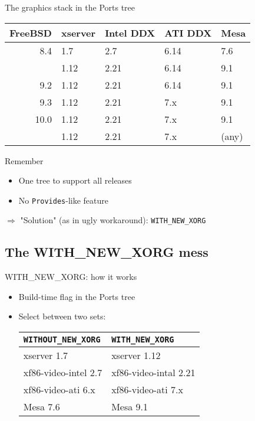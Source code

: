 \documentclass{beamer}
\begin{document}
\begin{frame}{The graphics stack in the Ports tree}
  \begin{tabular}{rllll}
    \hline
    \textbf{FreeBSD} & \textbf{xserver} & \textbf{Intel DDX} & \textbf{ATI DDX} & \textbf{Mesa} \\
    \hline
    8.4 & 1.7 & 2.7 & 6.14 & 7.6 \\
    \pause
    9.1 & 1.12 & 2.21 & 6.14 & 9.1 \\
    9.2 & 1.12 & 2.21 & 6.14 & 9.1 \\
    9.3 & 1.12 & 2.21 & 7.x & 9.1 \\
    10.0 & 1.12 & 2.21 & 7.x & 9.1 \\
    \pause
    10.1 & 1.12 & 2.21 & 7.x & (any) \\
    \hline
  \end{tabular}
\end{frame}

\begin{frame}
  \begin{block}{Remember}
    \begin{itemize}
      \item One tree to support all releases
      \item No \texttt{Provides}-like feature
    \end{itemize}
  \end{block}
  $\Rightarrow$ "Solution" (as in ugly workaround): \texttt{WITH\_NEW\_XORG}
\end{frame}

\subsection{The WITH\_NEW\_XORG mess}

\begin{frame}{WITH\_NEW\_XORG: how it works}
  \begin{itemize}
    \item Build-time flag in the Ports tree
    \item Select between two sets:
      \par
      \vspace{1em}
      \begin{tabular}{ll}
        \hline
        \textbf{\texttt{WITHOUT\_NEW\_XORG}} & \textbf{\texttt{WITH\_NEW\_XORG}} \\
        \hline
        xserver 1.7 & xserver 1.12 \\
        xf86-video-intel 2.7 & xf86-video-intal 2.21 \\
        xf86-video-ati 6.x & xf86-video-ati 7.x \\
        Mesa 7.6 & Mesa 9.1 \\
        \hline
      \end{tabular}
  \end{itemize}
\end{frame}
\end{document}
